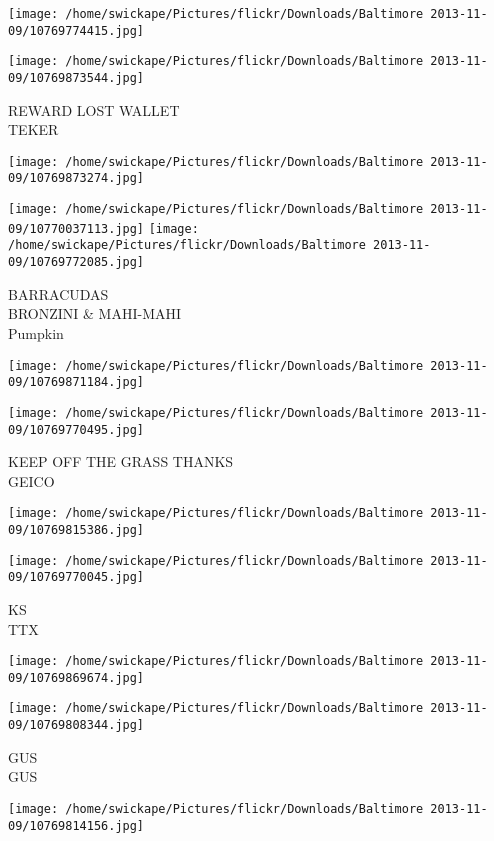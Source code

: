 \documentclass[10pt,letterpaper]{article}
\begin{document}
\texttt{[image: /home/swickape/Pictures/flickr/Downloads/Baltimore 2013-11-09/10769774415.jpg]}

\vspace{0.25in}
\texttt{[image: /home/swickape/Pictures/flickr/Downloads/Baltimore 2013-11-09/10769873544.jpg]}

REWARD LOST WALLET\\
TEKER
\pagebreak

\texttt{[image: /home/swickape/Pictures/flickr/Downloads/Baltimore 2013-11-09/10769873274.jpg]}

\vspace{0.25in}
\texttt{[image: /home/swickape/Pictures/flickr/Downloads/Baltimore 2013-11-09/10770037113.jpg]}
\texttt{[image: /home/swickape/Pictures/flickr/Downloads/Baltimore 2013-11-09/10769772085.jpg]}

BARRACUDAS\\
BRONZINI \& MAHI{-}MAHI\\
Pumpkin
\pagebreak

\texttt{[image: /home/swickape/Pictures/flickr/Downloads/Baltimore 2013-11-09/10769871184.jpg]}

\vspace{0.25in}
\texttt{[image: /home/swickape/Pictures/flickr/Downloads/Baltimore 2013-11-09/10769770495.jpg]}

KEEP OFF THE GRASS THANKS\\
GEICO
\pagebreak

\texttt{[image: /home/swickape/Pictures/flickr/Downloads/Baltimore 2013-11-09/10769815386.jpg]}

\vspace{0.25in}
\texttt{[image: /home/swickape/Pictures/flickr/Downloads/Baltimore 2013-11-09/10769770045.jpg]}

KS\\
TTX
\pagebreak

\texttt{[image: /home/swickape/Pictures/flickr/Downloads/Baltimore 2013-11-09/10769869674.jpg]}

\vspace{0.25in}
\texttt{[image: /home/swickape/Pictures/flickr/Downloads/Baltimore 2013-11-09/10769808344.jpg]}

GUS\\
GUS
\pagebreak

\texttt{[image: /home/swickape/Pictures/flickr/Downloads/Baltimore 2013-11-09/10769814156.jpg]}
\end{document}
